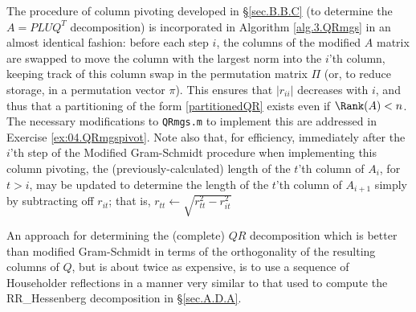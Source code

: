 The procedure of column pivoting developed in \S \ref{sec.B.B.C} (to determine the $A=PLU\!Q^T$ decomposition)
is incorporated in Algorithm \ref{alg.3.QRmgs} in an almost identical fashion: before each step $i$,
the columns of the modified $A$ matrix are swapped to move the column with the largest
norm into the $i$'th column, keeping track of this column swap in the permutation matrix $\Pi$ (or, to reduce storage,
in a permutation vector $\pi$). This ensures that $|r_{ii}|$ decreases with $i$,
and thus that a partitioning of the form \eqref{partitionedQR} exists even if $\Rank(A)<n$.  The necessary modifications to {\tt QRmgs.m}
to implement this are addressed in Exercise \ref{ex:04.QRmgspivot}.  
Note also that, for efficiency, immediately after the $i$'th step of the Modified Gram-Schmidt procedure when implementing
this column pivoting, the (previously-calculated)
length of the $t$'th column of $A_{i}$, for $t> i$, may be updated to determine the length of the $t$'th
column of $A_{i+1}$ simply by subtracting off $r_{i t}$; that is, $r_{tt} \leftarrow \sqrt{r_{tt}^2 - r_{it}^2}$ 


\noindent An approach for determining the (complete) $QR$ decomposition which is
better than modified Gram-Schmidt in terms of the orthogonality of the
resulting columns of $Q$, but is about twice as expensive, is to use a
sequence of Householder reflections in a manner very similar to that
used to compute the RR_Hessenberg decomposition in \S \ref{sec.A.D.A}.

